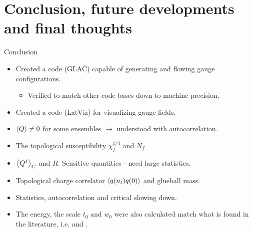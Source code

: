 \documentclass[10pt,show notes on second screen]{beamer}
\begin{document}
\section{Conclusion, future developments and final thoughts}
\begin{frame}{Conclusion}
\begin{itemize}
    \item <1->Created a code (GLAC) capable of generating and flowing gauge configurations.
    \begin{itemize}
        \item <2->Verified to match other code bases down to machine precision.
    \end{itemize}
    \item <3->Created a code (LatViz) for visualizing gauge fields.
    \item <4->$\left\langle{Q}\right\rangle \neq 0$ for some ensembles $\rightarrow$ understood with autocorrelation. %
    \item <5->The topological susceptibility $\chi^{1/4}_f$ and $N_f$ %
    \item <6->$\left\langle{Q^4}\right\rangle_C$ and $R$. Sensitive quantities - need large statistics.%
    \item <7->Topological charge correlator $\left\langle{q(n_t)q(0)}\right\rangle$ and glueball mass. %
    \item <8->Statistics, autocorrelation and critical slowing down.%
    \item <9->The energy, the scale $t_0$ and $w_0$ were also calculated match what is found in the literature, i.e. \citet{luscher_properties_2010} and \citet{ce_non-gaussianities_2015}.%
\end{itemize}
\note{\begin{itemize}

\end{itemize}}
\end{frame}
\end{document}
